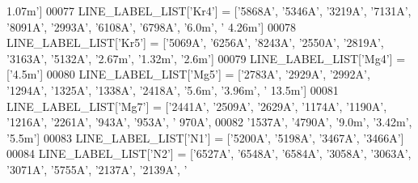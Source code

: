 \begin{DoxyCode}
{{{      1.07m'}]
00077 LINE\_LABEL\_LIST[\textcolor{stringliteral}{'Kr4'}] = [\textcolor{stringliteral}{'5868A'}, \textcolor{stringliteral}{'5346A'}, \textcolor{stringliteral}{'3219A'}, \textcolor{stringliteral}{'7131A'}, \textcolor{stringliteral}{'8091A'}, \textcolor{stringliteral}{'2993A'}, \textcolor{stringliteral}{'6108A'}, \textcolor{stringliteral}{'6798A'}, \textcolor{stringliteral}{'6.0m'}, \textcolor{stringliteral}{'
      4.26m'}]
00078 LINE\_LABEL\_LIST[\textcolor{stringliteral}{'Kr5'}] = [\textcolor{stringliteral}{'5069A'}, \textcolor{stringliteral}{'6256A'}, \textcolor{stringliteral}{'8243A'}, \textcolor{stringliteral}{'2550A'}, \textcolor{stringliteral}{'2819A'}, \textcolor{stringliteral}{'3163A'}, \textcolor{stringliteral}{'5132A'}, \textcolor{stringliteral}{'2.67m'}, \textcolor{stringliteral}{'1.32m'}, \textcolor{stringliteral}{
      '2.6m'}]
00079 LINE\_LABEL\_LIST[\textcolor{stringliteral}{'Mg4'}] = [\textcolor{stringliteral}{'4.5m'}]
00080 LINE\_LABEL\_LIST[\textcolor{stringliteral}{'Mg5'}] = [\textcolor{stringliteral}{'2783A'}, \textcolor{stringliteral}{'2929A'}, \textcolor{stringliteral}{'2992A'}, \textcolor{stringliteral}{'1294A'}, \textcolor{stringliteral}{'1325A'}, \textcolor{stringliteral}{'1338A'}, \textcolor{stringliteral}{'2418A'}, \textcolor{stringliteral}{'5.6m'}, \textcolor{stringliteral}{'3.96m'}, \textcolor{stringliteral}{'
      13.5m'}]
00081 LINE\_LABEL\_LIST[\textcolor{stringliteral}{'Mg7'}] = [\textcolor{stringliteral}{'2441A'}, \textcolor{stringliteral}{'2509A'}, \textcolor{stringliteral}{'2629A'}, \textcolor{stringliteral}{'1174A'}, \textcolor{stringliteral}{'1190A'}, \textcolor{stringliteral}{'1216A'}, \textcolor{stringliteral}{'2261A'}, \textcolor{stringliteral}{'943A'}, \textcolor{stringliteral}{'953A'}, \textcolor{stringliteral}{'
      970A'}, 
00082                           \textcolor{stringliteral}{'1537A'}, \textcolor{stringliteral}{'4790A'}, \textcolor{stringliteral}{'9.0m'}, \textcolor{stringliteral}{'3.42m'}, \textcolor{stringliteral}{'5.5m'}]
00083 LINE\_LABEL\_LIST[\textcolor{stringliteral}{'N1'}] = [\textcolor{stringliteral}{'5200A'}, \textcolor{stringliteral}{'5198A'}, \textcolor{stringliteral}{'3467A'}, \textcolor{stringliteral}{'3466A'}]
00084 LINE\_LABEL\_LIST[\textcolor{stringliteral}{'N2'}] = [\textcolor{stringliteral}{'6527A'}, \textcolor{stringliteral}{'6548A'}, \textcolor{stringliteral}{'6584A'}, \textcolor{stringliteral}{'3058A'}, \textcolor{stringliteral}{'3063A'}, \textcolor{stringliteral}{'3071A'}, \textcolor{stringliteral}{'5755A'}, \textcolor{stringliteral}{'2137A'}, \textcolor{stringliteral}{'2139A'}, \textcolor{stringliteral}{'
}}}
\end{DoxyCode}
